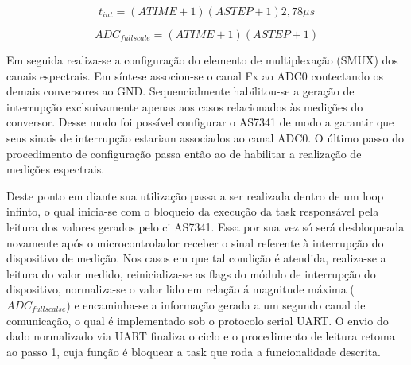 \documentclass[oneside,openright,12pt]{ufsm_2021} %
\begin{document}
            \begin{equation}
            \label{eq:AS7341_time}
                t_{int}=(ATIME+1)(ASTEP+1)2,78\mu s
            \end{equation}

            \begin{equation}
            \label{eq:AS7341_scale}
                ADC_{fullscale}=(ATIME+1)(ASTEP+1)
            \end{equation}
            
            \par Em seguida realiza-se a configuração do elemento de multiplexação (SMUX) dos canais espectrais. Em síntese associou-se o canal Fx ao ADC0 contectando os demais conversores ao GND. Sequencialmente habilitou-se a geração de interrupção exclsuivamente apenas aos casos relacionados às medições do conversor. Desse modo foi possível configurar o AS7341 de modo a garantir que seus sinais de interrupção estariam associados ao canal ADC0. O último passo do procedimento de configuração passa então ao de habilitar a realização de medições espectrais.
            
            
            \par Deste ponto em diante sua utilização passa a ser realizada dentro de um loop infinto, o qual inicia-se com o bloqueio da execução da task responsável pela leitura dos valores gerados pelo ci AS7341. Essa por sua vez só será desbloqueada novamente após o microcontrolador receber o sinal referente à interrupção do dispositivo de medição. Nos casos em que tal condição é atendida, realiza-se a leitura do valor medido, reinicializa-se as flags do módulo de interrupção do dispositivo, normaliza-se o valor lido em relação á magnitude máxima ($ADC_{fullscalse}$) e encaminha-se a informação gerada a um segundo canal de comunicação, o qual é implementado sob o protocolo serial UART. O envio do dado normalizado via UART finaliza o ciclo e o procedimento de leitura retoma ao passo 1, cuja função é bloquear a task que roda a funcionalidade descrita.
\end{document}
